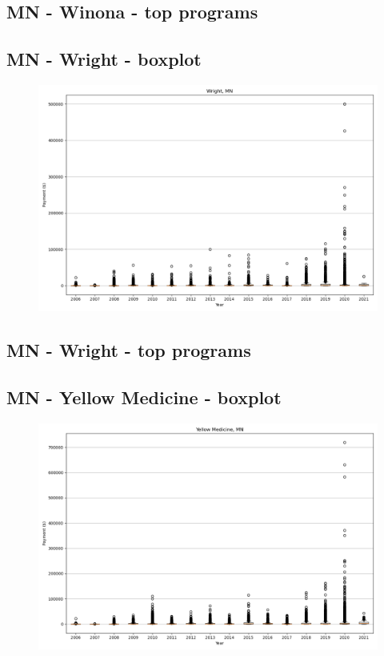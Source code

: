 \subsection*{MN - Winona - top programs}

\newpage
\subsection*{MN - Wright - boxplot}
\begin{figure}[h]
\centering
\includegraphics[width=7in]{../output/boxplots/counties/Wright-MN_boxplot.png}
\end{figure}


\subsection*{MN - Wright - top programs}

\newpage
\subsection*{MN - Yellow Medicine - boxplot}
\begin{figure}[h]
\centering
\includegraphics[width=7in]{../output/boxplots/counties/Yellow Medicine-MN_boxplot.png}
\end{figure}


